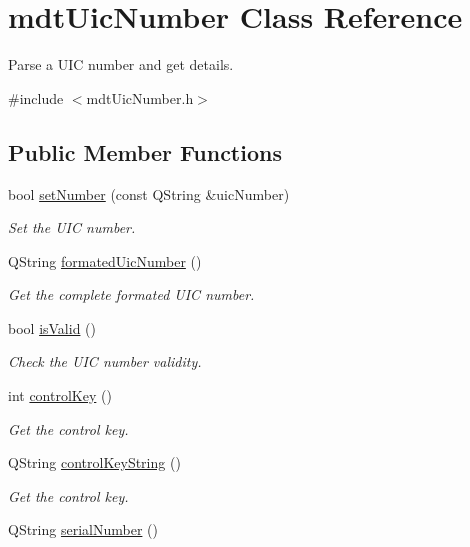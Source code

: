\hypertarget{classmdt_uic_number}{
\section{mdtUicNumber Class Reference}
\label{classmdt_uic_number}
}


Parse a UIC number and get details.  




{\ttfamily \#include $<$mdtUicNumber.h$>$}

\subsection*{Public Member Functions}
\begin{DoxyCompactItemize}
\item 
bool \hyperlink{classmdt_uic_number_aadf50072784344824c696da7cff5b445}{setNumber} (const QString \&uicNumber)
\begin{DoxyCompactList}\small\item\em Set the UIC number. \end{DoxyCompactList}\item 
QString \hyperlink{classmdt_uic_number_a0eda9b614e91b32c0d99bc016d906eae}{formatedUicNumber} ()
\begin{DoxyCompactList}\small\item\em Get the complete formated UIC number. \end{DoxyCompactList}\item 
bool \hyperlink{classmdt_uic_number_aac3c9e1adb6f9646216b4327645a621a}{isValid} ()
\begin{DoxyCompactList}\small\item\em Check the UIC number validity. \end{DoxyCompactList}\item 
int \hyperlink{classmdt_uic_number_acd5013109fc4b953023333ac1382edd6}{controlKey} ()
\begin{DoxyCompactList}\small\item\em Get the control key. \end{DoxyCompactList}\item 
QString \hyperlink{classmdt_uic_number_a7a66af4f41cfaf69d53b9db66f465c27}{controlKeyString} ()
\begin{DoxyCompactList}\small\item\em Get the control key. \end{DoxyCompactList}\item 
QString \hyperlink{classmdt_uic_number_ad4fbefb268327d15c2d39d2a17f45180}{serialNumber} ()

\end{DoxyCompactItemize}
